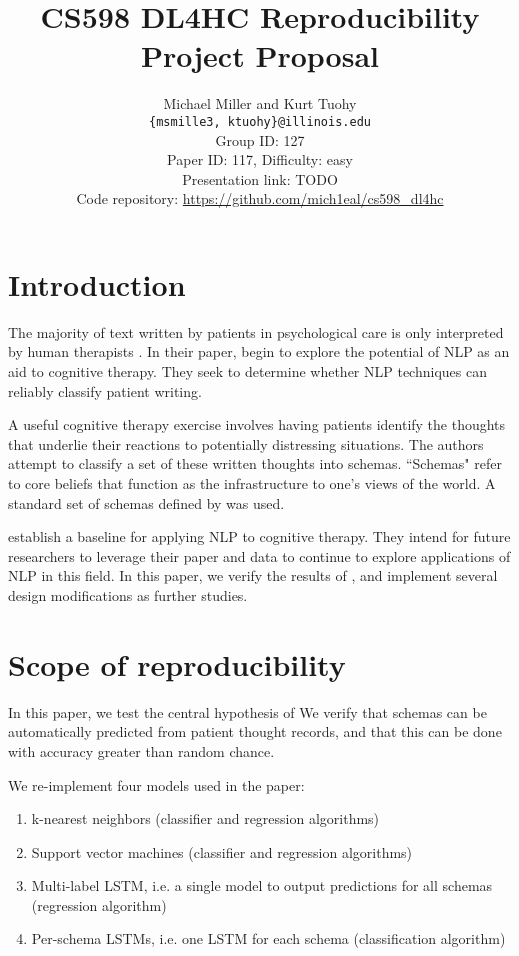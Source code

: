 \documentclass[11pt,a4paper]{article}
\title{CS598 DL4HC Reproducibility Project Proposal}
\author{Michael Miller and Kurt Tuohy\\
  \texttt{\{msmille3, ktuohy\}@illinois.edu}
  \\[2em]
  Group ID: 127\\
  Paper ID: 117, Difficulty: easy\\
  Presentation link: TODO\url{} \\
  Code repository: \url{https://github.com/mich1eal/cs598_dl4hc}}
\begin{document}
\maketitle


\section{Introduction}

The majority of text written by patients in psychological care is only interpreted by human therapists \citep{burger_2021}. In their paper, \citeauthor{burger_2021} begin to explore the potential of NLP as an aid to cognitive therapy. They seek to determine whether NLP techniques can reliably classify patient writing.

A useful cognitive therapy exercise involves having patients identify the thoughts that underlie their reactions to potentially distressing situations. The authors attempt to classify a set of these written thoughts into schemas. ``Schemas" refer to core beliefs that function as the infrastructure to one's views of the world. A standard set of schemas defined by \citeauthor{millings_2015} was used.

\citeauthor{burger_2021} establish a baseline for applying NLP to cognitive therapy. They intend for future researchers to leverage their paper and data to continue to explore applications of NLP in this field. In this paper, we verify the results of \citeauthor{burger_2021}, and implement several design modifications as further studies. 

\section{Scope of reproducibility}

In this paper, we test the central hypothesis of \citeauthor{burger_2021} We verify that schemas can be automatically predicted from patient thought records, and that this can be done with accuracy greater than random chance.

We re-implement four models used in the paper:
\begin{enumerate}
    \item k-nearest neighbors (classifier and regression algorithms)
    \item Support vector machines (classifier and regression algorithms)
    \item Multi-label LSTM, i.e. a single model to output predictions for all schemas (regression algorithm)
    \item Per-schema LSTMs, i.e. one LSTM for each schema (classification algorithm)
\end{enumerate}
\end{document}
